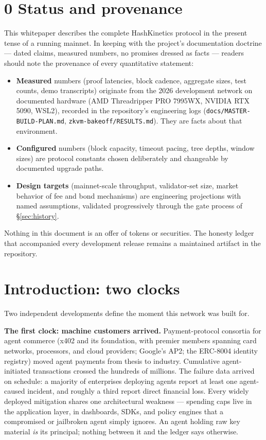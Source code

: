 \documentclass[11pt]{article}
\newcommand{\ct}[1]{\texttt{#1}}
\begin{document}
\section*{0 \quad Status and provenance}
This whitepaper describes the complete HashKinetics protocol in the present tense of a running mainnet. In keeping with the project's documentation doctrine --- dated claims, measured numbers, no promises dressed as facts --- readers should note the provenance of every quantitative statement:
\begin{itemize}[leftmargin=1.4em,itemsep=2pt]
  \item \textbf{Measured} numbers (proof latencies, block cadence, aggregate sizes, test counts, demo transcripts) originate from the 2026 development network on documented hardware (AMD Threadripper PRO 7995WX, NVIDIA RTX 5090, WSL2), recorded in the repository's engineering logs (\ct{docs/MASTER-BUILD-PLAN.md}, \ct{zkvm-bakeoff/RESULTS.md}). They are facts about that environment.
  \item \textbf{Configured} numbers (block capacity, timeout pacing, tree depths, window sizes) are protocol constants chosen deliberately and changeable by documented upgrade paths.
  \item \textbf{Design targets} (mainnet-scale throughput, validator-set size, market behavior of fee and bond mechanisms) are engineering projections with named assumptions, validated progressively through the gate process of \S\ref{sec:history}.
\end{itemize}
Nothing in this document is an offer of tokens or securities. The honesty ledger that accompanied every development release remains a maintained artifact in the repository.

\section{Introduction: two clocks}
Two independent developments define the moment this network was built for.

\textbf{The first clock: machine customers arrived.} Payment-protocol consortia for agent commerce (x402 and its foundation, with premier members spanning card networks, processors, and cloud providers; Google's AP2; the ERC-8004 identity registry) moved agent payments from thesis to industry. Cumulative agent-initiated transactions crossed the hundreds of millions. The failure data arrived on schedule: a majority of enterprises deploying agents report at least one agent-caused incident, and roughly a third report direct financial loss. Every widely deployed mitigation shares one architectural weakness --- spending caps live in the application layer, in dashboards, SDKs, and policy engines that a compromised or jailbroken agent simply ignores. An agent holding raw key material \emph{is} its principal; nothing between it and the ledger says otherwise.
\end{document}
